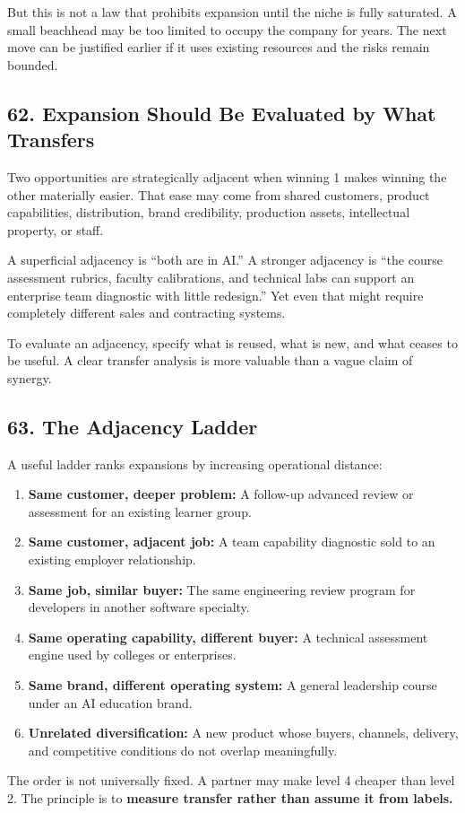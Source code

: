 But this is not a law that prohibits expansion until the niche is fully saturated. A small beachhead may be too limited to occupy the company for years. The next move can be justified earlier if it uses existing resources and the risks remain bounded.

\subsection*{62. Expansion Should Be Evaluated by What Transfers}

Two opportunities are strategically adjacent when winning 1 makes winning the other materially easier. That ease may come from shared customers, product capabilities, distribution, brand credibility, production assets, intellectual property, or staff.

A superficial adjacency is ``both are in AI.'' A stronger adjacency is ``the course assessment rubrics, faculty calibrations, and technical labs can support an enterprise team diagnostic with little redesign.'' Yet even that might require completely different sales and contracting systems.

To evaluate an adjacency, specify what is reused, what is new, and what ceases to be useful. A clear transfer analysis is more valuable than a vague claim of synergy.

\subsection*{63. The Adjacency Ladder}

A useful ladder ranks expansions by increasing operational distance:

\begin{enumerate}
    \item \textbf{Same customer, deeper problem:} A follow-up advanced review or assessment for an existing learner group.
    \item \textbf{Same customer, adjacent job:} A team capability diagnostic sold to an existing employer relationship.
    \item \textbf{Same job, similar buyer:} The same engineering review program for developers in another software specialty.
    \item \textbf{Same operating capability, different buyer:} A technical assessment engine used by colleges or enterprises.
    \item \textbf{Same brand, different operating system:} A general leadership course under an AI education brand.
    \item \textbf{Unrelated diversification:} A new product whose buyers, channels, delivery, and competitive conditions do not overlap meaningfully.
\end{enumerate}

The order is not universally fixed. A partner may make level 4 cheaper than level 2. The principle is to \textbf{measure transfer rather than assume it from labels.}
